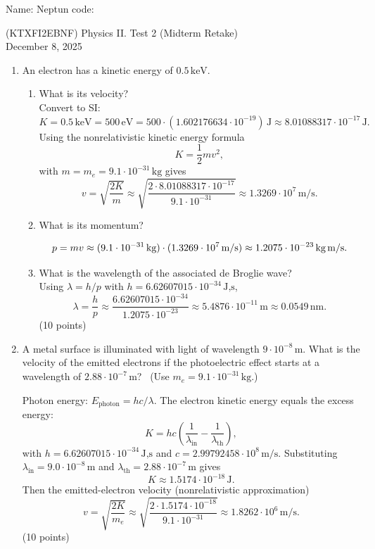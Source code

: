 \documentclass[12pt]{letter}
\begin{document}
Name: \hrulefill \quad Neptun code: \hrulefill

\begin{center}
(KTXFI2EBNF) Physics II. Test 2 (Midterm Retake) \\
December 8, 2025
\end{center}

\bigskip

\begin{enumerate}
\setcounter{enumi}{0}

\item An electron has a kinetic energy of $0.5\,\text{keV}$. \\

\begin{enumerate}
\item What is its velocity?\\

Convert to SI: $K = 0.5\,\text{keV} = 500\,\text{eV} = 500\cdot(1.602176634\cdot10^{-19})\,\text{J} \approx 8.01088317\cdot10^{-17}\,\text{J}.$
Using the nonrelativistic kinetic energy formula
$$ K=\frac{1}{2} m v^{2}, $$
with $m=m_e=9.1\cdot10^{-31}\,\text{kg}$ gives
$$ v=\sqrt{\frac{2K}{m}}\approx \sqrt{\frac{2\cdot 8.01088317\cdot10^{-17}}{9.1\cdot10^{-31}}}
\approx 1.3269\cdot10^{7}\,\text{m/s}. $$

\item What is its momentum?

$$ p=m v \approx (9.1\cdot10^{-31}\,\text{kg})\cdot(1.3269\cdot10^{7}\,\text{m/s})
\approx 1.2075\cdot10^{-23}\,\text{kg\,m/s}. $$

\item What is the wavelength of the associated de Broglie wave?\\

Using $\lambda = h/p$ with $h=6.62607015\cdot10^{-34}\,\text{J,s}$,
$$ \lambda=\frac{h}{p}\approx \frac{6.62607015\cdot10^{-34}}{1.2075\cdot10^{-23}}
\approx 5.4876\cdot10^{-11}\,\text{m} \approx 0.0549\,\text{nm}. $$
\hfill (10 points)
\end{enumerate}

\bigskip
\item A metal surface is illuminated with light of wavelength $9\cdot10^{-8}\,\text{m}$. What is the velocity of the emitted
electrons if the photoelectric effect starts at a wavelength of $2.88\cdot10^{-7}\,\text{m}$? \
(Use $m_e=9.1\cdot10^{-31}\,\text{kg}$.)\

Photon energy: $E_\text{photon}=hc/\lambda$. The electron kinetic energy equals the excess energy:
$$ K = hc\left(\frac{1}{\lambda_\text{in}}-\frac{1}{\lambda_\text{th}}\right), $$
with $h=6.62607015\cdot10^{-34}\,\text{J,s}$ and $c=2.99792458\cdot10^{8}\,\text{m/s}$. Substituting $\lambda_\text{in}=9.0\cdot10^{-8}\,\text{m}$ and $\lambda_\text{th}=2.88\cdot10^{-7}\,\text{m}$ gives
$$ K \approx 1.5174\cdot10^{-18}\,\text{J}. $$
Then the emitted-electron velocity (nonrelativistic approximation)
$$ v=\sqrt{\frac{2K}{m_e}}\approx \sqrt{\frac{2\cdot1.5174\cdot10^{-18}}{9.1\cdot10^{-31}}}
\approx 1.8262\cdot10^{6}\,\text{m/s}. $$
\hfill (10 points)


\end{enumerate}
\end{document}
